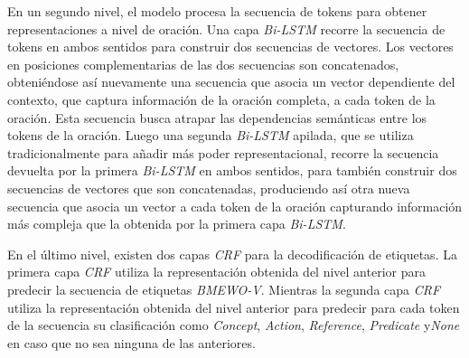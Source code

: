 En un segundo nivel, el modelo procesa la secuencia de tokens para obtener representaciones a nivel de oraci\'on. Una capa \emph{Bi-LSTM} recorre la secuencia de tokens en ambos sentidos para construir dos secuencias de vectores. Los vectores en posiciones complementarias de las dos secuencias son concatenados, obteni\'endose as\'i nuevamente una secuencia que asocia un vector dependiente del contexto, que captura informaci\'on de la oraci\'on completa, a cada token de la oraci\'on. Esta secuencia busca atrapar las dependencias semánticas entre los tokens de la oración.
Luego una segunda \emph{Bi-LSTM} apilada, que se utiliza tradicionalmente para a\~nadir m\'as poder representacional, recorre la secuencia devuelta por la primera \emph{Bi-LSTM} en ambos sentidos, para tambi\'en construir dos secuencias de vectores que son concatenadas, produciendo as\'i otra nueva secuencia que asocia un vector a cada token de la oraci\'on capturando informaci\'on m\'as compleja que la obtenida por la primera capa \emph{Bi-LSTM}.

En el \'ultimo nivel, existen dos capas \emph{CRF} para la decodificaci\'on de etiquetas. La primera capa \emph{CRF} utiliza la representaci\'on obtenida del nivel anterior para predecir la secuencia de etiquetas \emph{BMEWO-V}. Mientras la segunda capa \emph{CRF} utiliza la representaci\'on obtenida del nivel anterior para predecir para cada token de la secuencia su clasificaci\'on como \emph{Concept}, \emph{Action}, \emph{Reference}, \emph{Predicate} y\emph{None} en caso que no sea ninguna de las anteriores.

